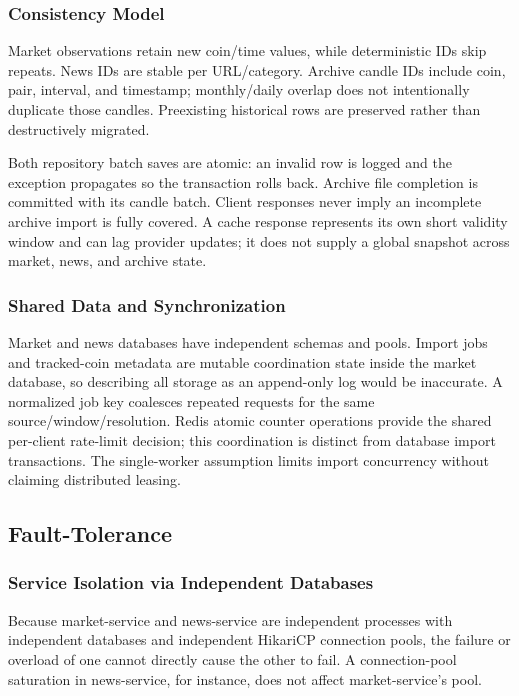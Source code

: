 \documentclass{scrartcl}
\begin{document}
\subsubsection{Consistency Model}\label{consistency-model}

Market observations retain new coin/time values, while deterministic IDs skip repeats. News IDs
are stable per URL/category. Archive candle IDs include coin, pair, interval, and timestamp;
monthly/daily overlap does not intentionally duplicate those candles. Preexisting historical
rows are preserved rather than destructively migrated.

Both repository batch saves are atomic: an invalid row is logged and the exception propagates so
the transaction rolls back. Archive file completion is committed with its candle batch. Client
responses never imply an incomplete archive import is fully covered. A cache response represents
its own short validity window and can lag provider updates; it does not supply a global snapshot
across market, news, and archive state.

\subsubsection{Shared Data and Synchronization}\label{shared-data-sync}

Market and news databases have independent schemas and pools. Import jobs and tracked-coin
metadata are mutable coordination state inside the market database, so describing all storage as
an append-only log would be inaccurate. A normalized job key coalesces repeated requests for the
same source/window/resolution. Redis atomic counter operations provide the shared per-client
rate-limit decision; this coordination is distinct from database import transactions.
The single-worker assumption limits import concurrency without claiming distributed leasing.

\subsection{Fault-Tolerance}\label{fault-tolerance}

\subsubsection{Service Isolation via Independent Databases}\label{fault-tolerance-isolation}

Because market-service and news-service are independent processes with independent databases and
independent HikariCP connection pools, the failure or overload of one cannot directly cause the
other to fail. A connection-pool saturation in news-service, for instance, does not affect
market-service's pool.
\end{document}
